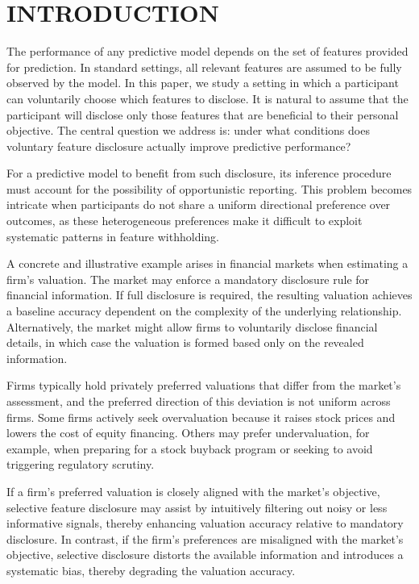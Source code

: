 \section{INTRODUCTION}

The performance of any predictive model depends on the set of features provided for prediction. In standard settings, all relevant features are assumed to be fully observed by the model. In this paper, we study a setting in which a participant can voluntarily choose which features to disclose. It is natural to assume that the participant will disclose only those features that are beneficial to their personal objective. The central question we address is: under what conditions does voluntary feature disclosure actually improve predictive performance?

For a predictive model to benefit from such disclosure, its inference procedure must account for the possibility of opportunistic reporting. This problem becomes intricate when participants do not share a uniform directional preference over outcomes, as these heterogeneous preferences make it difficult to exploit systematic patterns in feature withholding.

A concrete and illustrative example arises in financial markets when estimating a firm's valuation. The market may enforce a mandatory disclosure rule for financial information. If full disclosure is required, the resulting valuation achieves a baseline accuracy dependent on the complexity of the underlying relationship. Alternatively, the market might allow firms to voluntarily disclose financial details, in which case the valuation is formed based only on the revealed information.

Firms typically hold privately preferred valuations that differ from the market's assessment, and the preferred direction of this deviation is not uniform across firms. Some firms actively seek overvaluation because it raises stock prices and lowers the cost of equity financing. Others may prefer undervaluation, for example, when preparing for a stock buyback program or seeking to avoid triggering regulatory scrutiny.

If a firm's preferred valuation is closely aligned with the market's objective, selective feature disclosure may assist by intuitively filtering out noisy or less informative signals, thereby enhancing valuation accuracy relative to mandatory disclosure. In contrast, if the firm's preferences are misaligned with the market's objective, selective disclosure distorts the available information and introduces a systematic bias, thereby degrading the valuation accuracy.

